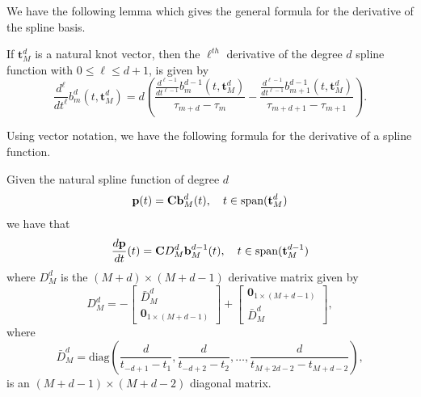 We have the following lemma which gives the general formula for the derivative of the spline basis.
\begin{lemma}\label{lem:derivative_basis_functions}
If $\mathbf{t}_M^d$ is a natural knot vector, then the $\ell^{th}$ derivative of the degree $d$ spline function with  $0\leq \ell \leq d+1$, is given by
\[
\frac{d^\ell}{dt^\ell}b_m^{d}(t,  \mathbf{t}_M^d) = d\left(\frac{\frac{d^{\ell-1}}{dt^{\ell-1}}b_m^{d-1}(t,  \mathbf{t}_M^d)}{\tau_{m+d}-\tau_m} - \frac{\frac{d^{\ell-1}}{dt^{\ell-1}}b_{m+1}^{d-1}(t,  \mathbf{t}_M^d)}{\tau_{m+d+1}-\tau_{m+1}} \right).
\]	
\end{lemma}

Using vector notation, we have the following formula for the derivative of a spline function.
\begin{lemma} \label{lem:derivative_of_spline}
Given the natural spline function of degree $d$
\[
\mathbf{p}(t) = \mathbf{C} \mathbf{b}_M^d(t), \quad t\in\text{span}(\mathbf{t}_M^d)
\]
we have that
\[
\frac{d\mathbf{p}}{dt}(t) = \mathbf{C} D_M^d \mathbf{b}_M^{d-1}(t), \quad t\in\text{span}(\mathbf{t}_M^{d-1})
\]	
where $D_M^d$ is the $(M+d)\times (M+d-1)$ derivative matrix given by
\begin{equation}\label{eq:D_d}
D_M^d = -\begin{bmatrix}\bar{D}_M^d \\ \mathbf{0}_{1\times(M+d-1)} \end{bmatrix} + \begin{bmatrix}\mathbf{0}_{1\times(M+d-1)} \\ \bar{D}_M^d \end{bmatrix},
\end{equation}
where
\begin{equation}\label{eq:D_d_bar}
\bar{D}_M^d = \text{diag}\left(\frac{d}{t_{-d+1}-t_1}, \frac{d}{t_{-d+2}-t_2}, \dots,  \frac{d}{t_{M+2d-2}-t_{M+d-2}}\right),
\end{equation}
is an $(M+d-1)\times(M+d-2)$ diagonal matrix.
\end{lemma}
